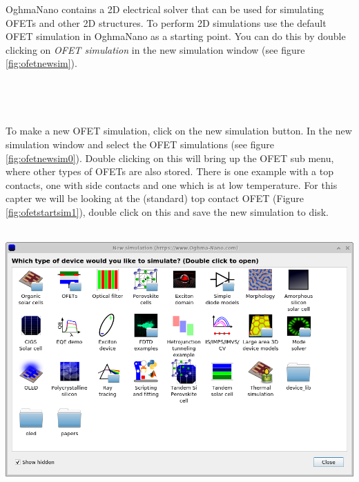 OghmaNano contains a 2D electrical solver that can be used for simulating OFETs and other 2D structures.  To perform 2D simulations use the default OFET simulation in OghmaNano as a starting point.  You can do this by double clicking on \emph{OFET simulation} in the new simulation window (see figure \ref{fig:ofetnewsim}).
\\
\\
\\
\\
\\
To make a new OFET simulation, click on the new simulation button. In the new simulation window and select the OFET simulations (see figure \ref{fig:ofetnewsim0}).  Double clicking on this will bring up the OFET sub menu, where other types of OFETs are also stored. There is one example with a top contacts, one with side contacts and one which is at low temperature. For this capter we will be looking at the (standard) top contact OFET (Figure \ref{fig:ofetstartsim1}), double click on this and save the new simulation to disk.
\\
\\
\noindent
\begin{minipage}{0.5\textwidth}
	\centering
	\includegraphics[width=\linewidth,height=0.8\linewidth]{./images/ofet/ofet_new_sim0.png}
	\label{fig:ofetnewsim0}
\end{minipage}
